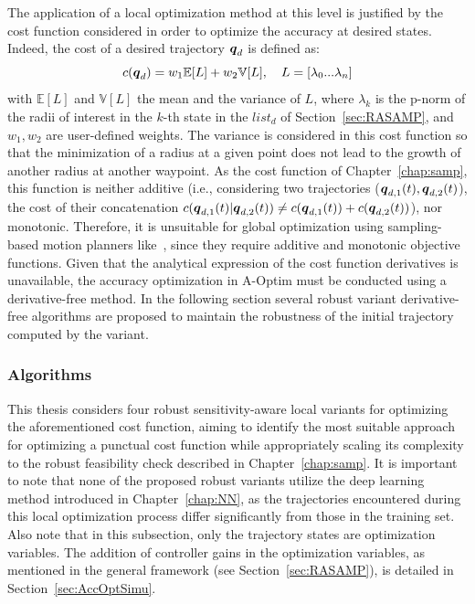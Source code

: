 The application of a local optimization method at this level is justified by the cost function considered in order to optimize the accuracy at desired states. 
Indeed, the cost of a desired trajectory $\boldsymbol{q}_d$ is defined as:
\begin{equation}\label{eq: cost}
    c(\boldsymbol{q}_d) = w_1\mathbb{E}[L] + w_2\mathbb{V}[L], \quad L = \left[\lambda_{0} ... \lambda_n \right]
\end{equation}
with $\mathbb{E}[L]$ and $\mathbb{V}[L]$ the mean and the variance of $L$, where $\lambda_k$ is the p-norm of the radii of interest in the $k$-th state in the $list_{d}$ of Section~\ref{sec:RASAMP}, and $w_1, w_2$ are user-defined weights.
The variance is considered in this cost function so that the minimization of a radius at a given point does not lead to the growth of another radius at another waypoint.
As the cost function of Chapter~\ref{chap:samp}, this function is neither additive (i.e., considering two trajectories ($\boldsymbol{q}_{d,1}(t), \boldsymbol{q}_{d,2}(t)$), the cost of their concatenation $c(\boldsymbol{q}_{d,1}(t)|\boldsymbol{q}_{d,2}(t)) \neq c(\boldsymbol{q}_{d,1}(t)) + c(\boldsymbol{q}_{d,2}(t))$), nor monotonic. 
Therefore, it is unsuitable for global optimization using sampling-based motion planners like~\cite{cRRT,cRRTstar}, since they require additive and monotonic objective functions.
Given that the analytical expression of the cost function derivatives is unavailable, the accuracy optimization in A-Optim must be conducted using a derivative-free method.
In the following section several robust variant derivative-free algorithms are proposed to maintain the robustness of the initial trajectory computed by the  variant.

\subsubsection{Algorithms}

This thesis considers four robust sensitivity-aware local variants for optimizing the aforementioned cost function, aiming to identify the most suitable approach for optimizing a punctual cost function while appropriately scaling its complexity to the robust feasibility check described in Chapter~\ref{chap:samp}. 
It is important to note that none of the proposed robust variants utilize the deep learning method introduced in Chapter~\ref{chap:NN}, as the trajectories encountered during this local optimization process differ significantly from those in the training set.
Also note that in this subsection, only the trajectory states are optimization variables. 
The addition of controller gains in the optimization variables, as mentioned in the general framework (see Section~\ref{sec:RASAMP}), is detailed in Section~\ref{sec:AccOptSimu}.

